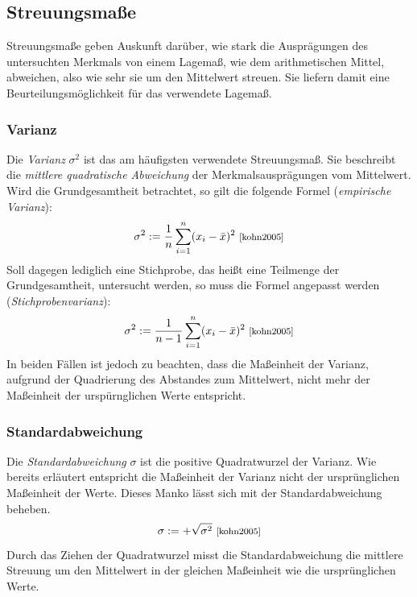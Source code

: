 \documentclass[fontsize=11pt]{scrartcl}
\begin{document}
                \subsection{Streuungsmaße}
                    Streuungsmaße geben Auskunft darüber, wie stark die Ausprägungen des untersuchten Merkmals von einem Lagemaß, wie dem arithmetischen Mittel, abweichen, also wie sehr sie um den Mittelwert streuen. Sie liefern damit eine Beurteilungsmöglichkeit für das verwendete Lagemaß.\cite{ertel2016,kohn2005}
                    
                    \subsubsection{Varianz}
                        Die \emph{Varianz} $\sigma^2$ ist das am häufigsten verwendete Streuungsmaß. Sie beschreibt die \emph{mittlere quadratische Abweichung} der Merkmalsausprägungen vom Mittelwert.
                        Wird die Grundgesamtheit betrachtet, so gilt die folgende Formel (\emph{empirische Varianz}): 
                        $$
                            \sigma^2 := \frac{1}{n}\sum_{i=1}^n(x_i - \bar{x})^2 \text{ \footnotesize\cite[S.74]{kohn2005}}
                        $$
                        Soll dagegen lediglich eine Stichprobe, das heißt eine Teilmenge der Grundgesamtheit, untersucht werden, so muss die Formel angepasst werden (\emph{Stichprobenvarianz}):
                        $$
                            \sigma^2 := \frac{1}{n-1}\sum_{i=1}^n(x_i - \bar{x})^2 \text{ \footnotesize\cite[vgl. S. 74]{kohn2005}}
                        $$
                        In beiden Fällen ist jedoch zu beachten, dass die Maßeinheit der Varianz, aufgrund der Quadrierung des Abstandes zum Mittelwert, nicht mehr der Maßeinheit der urspürnglichen Werte entspricht.\cite{kohn2005}
                    
                    \subsubsection{Standardabweichung}
                        Die \emph{Standardabweichung} $\sigma$ ist die positive Quadratwurzel der Varianz. Wie bereits erläutert entspricht die Maßeinheit der Varianz nicht der ursprünglichen Maßeinheit der Werte. Dieses Manko lässt sich mit der Standardabweichung beheben.
                        $$ \sigma := + \sqrt{\sigma^2} \text{ \footnotesize\cite[S.76]{kohn2005}}$$
                        Durch das Ziehen der Quadratwurzel misst die Standardabweichung die mittlere Streuung um den Mittelwert in der gleichen Maßeinheit wie die ursprünglichen Werte.\cite{kohn2005}
\end{document}
